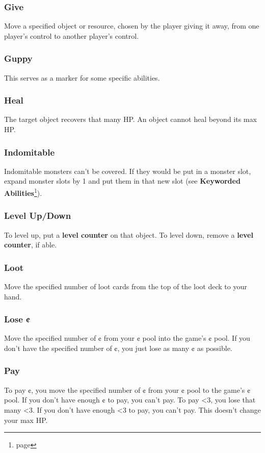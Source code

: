 \documentclass[10pt, a4paper, twoside]{article} %
\begin{document}
    \subsubsection*{Give}
    Move a specified object or resource, chosen by the player giving it away, from one player’s control to another player’s control.
    \subsubsection*{Guppy}
    This serves as a marker for some specific abilities.
    \subsubsection*{Heal}
    The target object recovers that many HP. An object cannot heal beyond its max HP.
    \subsubsection*{Indomitable}
    Indomitable monsters can’t be covered. If they would be put in a monster slot, expand monster slots by 1 and put them in that new slot (see \textbf{Keyworded Abilities}\footnote{page \pageref{keyworded}}).
    \subsubsection*{Level Up/Down}
    To level up, put a \textbf{level counter} on that object. To level down, remove a \textbf{level counter}, if able.
    \subsubsection*{Loot}
    Move the specified number of loot cards from the top of the loot deck to your hand.
    \subsubsection*{Lose ¢}
    Move the specified number of ¢ from your ¢ pool into the game’s ¢ pool. If you don’t have the specified number of ¢, you just lose as many ¢ as possible.
    \subsubsection*{Pay}
    To pay ¢, you move the specified number of ¢ from your ¢ pool to the game’s ¢ pool. If you don’t have enough ¢ to pay, you can’t pay. To pay <3, you lose that many <3. If you don’t have enough <3 to pay, you can’t pay. This doesn’t change your max HP.
\end{document}
